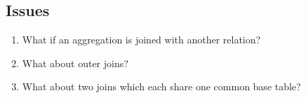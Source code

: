 \subsection{Issues}
\begin{enumerate}
	\item What if an aggregation is joined with another relation?
	\item What about outer joins?
	\item What about two joins which each share one common base table?
\end{enumerate}